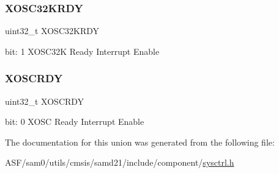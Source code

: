 \subsubsection{\texorpdfstring{XOSC32KRDY}{XOSC32KRDY}}
{\footnotesize\ttfamily uint32\+\_\+t X\+O\+S\+C32\+K\+R\+DY}

bit\+: 1 X\+O\+S\+C32K Ready Interrupt Enable \mbox{\label{union_s_y_s_c_t_r_l___i_n_t_e_n_s_e_t___type_ae3f4eaf046b9b3a9346c0d1d2d91cc06}} 
\subsubsection{\texorpdfstring{XOSCRDY}{XOSCRDY}}
{\footnotesize\ttfamily uint32\+\_\+t X\+O\+S\+C\+R\+DY}

bit\+: 0 X\+O\+SC Ready Interrupt Enable 

The documentation for this union was generated from the following file\+:\begin{DoxyCompactItemize}
\item 
A\+S\+F/sam0/utils/cmsis/samd21/include/component/\mbox{\hyperlink{component_2sysctrl_8h}{sysctrl.\+h}}\end{DoxyCompactItemize}
